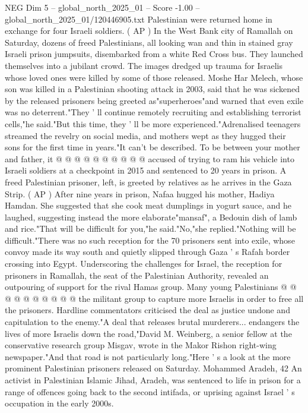 \begin{textsample}{NEG Dim 5 – global\_north\_2025\_01 – Score -1.00 – global\_north\_2025\_01/120446905.txt}  \label{ex:f5_neg_074}
Palestinian were returned home in exchange for four Israeli soldiers. ( AP ) In the West Bank city of Ramallah on Saturday, dozens of freed Palestinians, all looking wan and thin in stained gray Israeli prison jumpsuits, disembarked from a white Red Cross bus.
They launched themselves into a jubilant crowd.
The images dredged up trauma for Israelis whose loved ones were killed by some of those released.
Moshe Har Melech, whose son was killed in a Palestinian shooting attack in 2003, said that he was sickened by the released prisoners being greeted as"superheroes"and warned that even exile was no deterrent."They ' ll continue remotely recruiting and establishing terrorist cells,"he said."But this time, they ' ll be more experienced."Adrenalised teenagers streamed the revelry on social media, and mothers wept as they hugged their sons for the first time in years."It can't be described.
To be between your mother and father, it @ @ @ @ @ @ @ @ @ @ accused of trying to ram his vehicle into Israeli soldiers at a checkpoint in 2015 and sentenced to 20 years in prison.
A freed Palestinian prisoner, left, is greeted by relatives as he arrives in the Gaza Strip. ( AP ) After nine years in prison, Nafaa hugged his mother, Hadiya Hamdan.
She suggested that she cook meat dumplings in yogurt sauce, and he laughed, suggesting instead the more elaborate"mansaf", a Bedouin dish of lamb and rice."That will be difficult for you,"he said."No,"she replied."Nothing will be difficult."There was no such reception for the 70 prisoners sent into exile, whose convoy made its way south and quietly slipped through Gaza ' s Rafah border crossing into Egypt.
Underscoring the challenges for Israel, the reception for prisoners in Ramallah, the seat of the Palestinian Authority, revealed an outpouring of support for the rival Hamas group.
Many young Palestinians @ @ @ @ @ @ @ @ @ @ the militant group to capture more Israelis in order to free all the prisoners.
Hardline commentators criticised the deal as justice undone and capitulation to the enemy."A deal that releases brutal murderers... endangers the lives of more Israelis down the road,"David M.
Weinberg, a senior fellow at the conservative research group Misgav, wrote in the Makor Rishon right-wing newspaper."And that road is not particularly long."Here ' s a look at the more prominent Palestinian prisoners released on Saturday.
Mohammed Aradeh, 42 An activist in Palestinian Islamic Jihad, Aradeh, was sentenced to life in prison for a range of offences going back to the second intifada, or uprising against Israel ' s occupation in the early 2000s.

\end{textsample}
